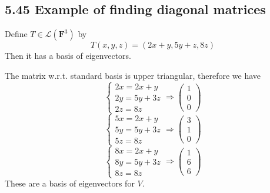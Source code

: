 \documentclass{article}
\begin{document}
\subsection*{5.45 Example of finding diagonal matrices}
Define $T \in \mathcal{L}(\mathbf{F}^3)$ by
\begin{equation*}
    T(x, y, z) = (2x+y, 5y+z, 8z)
\end{equation*}
Then it has a basis of eigenvectors.\\
\begin{addmargin}[1em]{0em}
    The matrix w.r.t. standard basis is upper triangular, therefore we have
    \begin{equation*}
        \begin{cases}
            2x = 2x+y\\
            2y = 5y+3z\\
            2z = 8z
        \end{cases} \Rightarrow \begin{pmatrix}
            1\\
            0\\
            0
        \end{pmatrix}
    \end{equation*}
    \begin{equation*}
        \begin{cases}
            5x = 2x+y\\
            5y = 5y+3z\\
            5z = 8z
        \end{cases} \Rightarrow \begin{pmatrix}
            3\\
            1\\
            0
        \end{pmatrix}
    \end{equation*}
    \begin{equation*}
        \begin{cases}
            8x = 2x+y\\
            8y = 5y+3z\\
            8z = 8z
        \end{cases} \Rightarrow \begin{pmatrix}
            1\\
            6\\
            6
        \end{pmatrix}
    \end{equation*}
    These are a basis of eigenvectors for $V$.
\end{addmargin}
\end{document}

